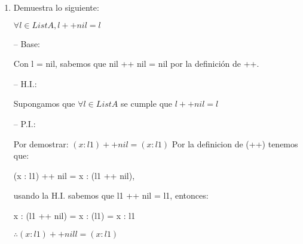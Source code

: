 \documentclass{article}
\begin{document}
\begin{enumerate}
\item Demuestra lo siguiente:

$\forall \textit{l} \in List A, \textit{l}++nil = \textit{l}$

– Base:

Con l = nil, sabemos que nil ++ nil = nil por la definición de ++. \Checkmark

– H.I.:

Supongamos que $\forall l \in List A$ se cumple que $l ++ nil = l$ \Checkmark

– P.I.:

Por demostrar: $(x : l1) ++ nil = (x : l1)$
Por la definicion de (++) tenemos que:

(x : l1) ++ nil = x : (l1 ++ nil), 

usando la H.I. sabemos que l1 ++ nil = l1, entonces:

x : (l1 ++ nil) = x : (l1) = x : l1

$\therefore (x : l1) ++ nill = (x : l1)$ \Checkmark


\end{enumerate}
\end{document}
